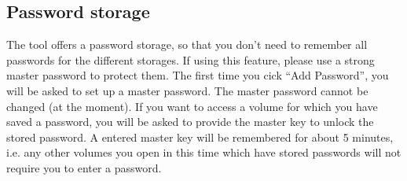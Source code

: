 \documentclass[a4paper,10pt]{report}
\begin{document}
\subsection{Password storage}
The tool offers a password storage, so that you don't need to remember all passwords for the different storages. If using this feature, please use a strong master password to protect them.
The first time you cick ``Add Password'', you will be asked to set up a master password. The master password cannot be changed (at the moment). 
If you want to access a volume for which you have saved a password, you will be asked to provide the master key to unlock the stored password. 
A entered master key will be remembered for about 5 minutes, i.e. any other volumes you open in this time which have stored passwords will not require you to enter a password.
\end{document}
